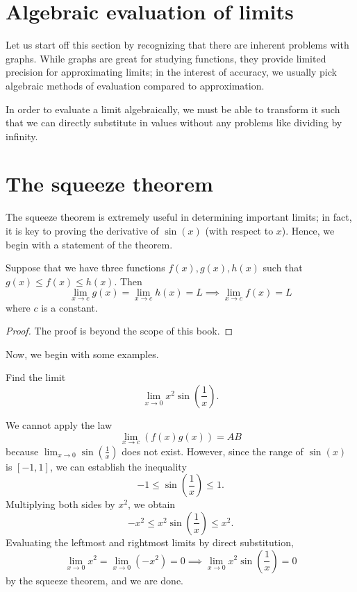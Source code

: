 \section{Algebraic evaluation of limits}
Let us start off this section by recognizing that there are inherent problems with graphs.
While graphs are great for studying functions, they provide limited precision for approximating
limits; in the interest of accuracy, we usually pick algebraic methods of evaluation compared to approximation.

In order to evaluate a limit algebraically, we must be able to transform it such that we can directly substitute
in values without any problems like dividing by infinity.

\section{The squeeze theorem}
The squeeze theorem is extremely useful in determining important limits; in fact, it is key to proving the
derivative of $\sin(x)$ (with respect to $x$). Hence, we begin with a statement of the theorem.

\begin{theorem}
    Suppose that we have three functions $f(x), g(x), h(x)$ such that $g(x)\le f(x)\le h(x)$. Then
    \[
    \lim_{x \to c} g(x) = \lim_{x \to c} h(x) = L \implies \lim_{x \to c} f(x) = L
    \]
    where $c$ is a constant.
\end{theorem}
\begin{proof}
    The proof is beyond the scope of this book.
\end{proof}

Now, we begin with some examples.

\begin{example}
    Find the limit \[\lim_{x \to 0}x^2\sin\left(\frac{1}{x}\right).\]
\end{example}
\begin{solution}
    We cannot apply the law
    \[
    \lim_{x \to c} (f(x) g(x)) = A B
    \]
    because $\lim_{x \to 0} \sin\left(\frac{1}{x}\right)$ does not exist. However, since the range of $\sin(x)$
    is $[-1, 1]$, we can establish the inequality \[-1 \le \sin\left(\frac{1}{x}\right) \le 1.\] Multiplying both
    sides by $x^2$, we obtain \[-x^2 \le x^2 \sin\left(\frac{1}{x}\right) \le x^2.\]
    Evaluating the leftmost and
    rightmost limits by direct substitution,
    \[\lim_{x \to 0} x^2 = \lim_{x \to 0} (-x^2) = 0 \implies
    \lim_{x \to 0} x^2 \sin\left(\frac{1}{x}\right) = 0 \]
    by the squeeze theorem, and we are done.
\end{solution}

